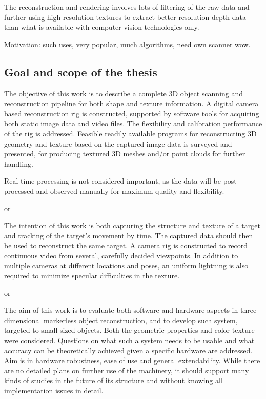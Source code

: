 
The reconstruction and rendering involves lots of filtering of the raw data and further using high-resolution textures to extract better resolution depth data than what is available with computer vision technologies only.


Motivation: such uses, very popular, much algorithms, need own scanner wow.

\subsection{Goal and scope of the thesis}



The objective of this work is to describe a complete 3D object scanning and reconstruction pipeline for both shape and texture information.
A digital camera based reconstruction rig is constructed, supported by software tools for acquiring both static image data and video files.
The flexibility and calibration performance of the rig is addressed.
Feasible readily available programs for reconstructing 3D geometry and texture based on the captured image data is surveyed and presented, for producing textured 3D meshes and/or point clouds for further handling.

Real-time processing is not considered important, as the data will be post-processed and observed manually for maximum quality and flexibility.

or

The intention of this work is both capturing the structure and texture of a target and tracking of the target's movement by time.
The captured data should then be used to reconstruct the same target.
A camera rig is constructed to record continuous video from several, carefully decided viewpoints.
In addition to multiple cameras at different locations and poses, an uniform lightning is also required to minimize specular difficulties in the texture.

or

The aim of this work is to evaluate both software and hardware aspects in three-dimensional markerless object reconstruction, and to develop such system, targeted to small sized objects.
Both the geometric properties and color texture were considered.
Questions on what such a system needs to be usable and what accuracy can be theoretically achieved given a specific hardware are addressed.
Aim is in hardware robustness, ease of use and general extendability. While there are no detailed plans on further use of the machinery, it should support many kinds of studies in the future of its structure and without knowing all implementation issues in detail.

